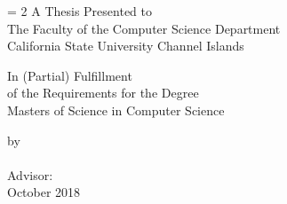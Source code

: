 \begin{titlepage}
\begin{center}
{\Large \bfseries \thesistitle \par}

\vspace{2 cm}
\baselineskip = 2\baselineskip
A Thesis Presented to \\
The Faculty of the Computer Science Department\\
California State University Channel Islands

\vspace{1 cm}

In (Partial) Fulfillment\\
of the Requirements for the Degree\\
Masters of Science in Computer Science\\

\vspace{1 cm }

\vfill

by \\
\studentname\\
Advisor: \advisorname\\
October 2018
\end{center}
\end{titlepage}